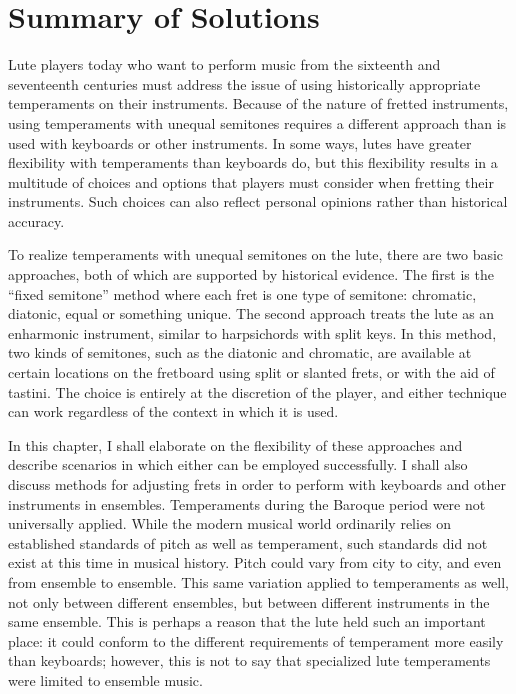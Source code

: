 \chapter{Summary of Solutions}

Lute players today who want to perform music from the sixteenth and seventeenth
centuries must address the issue of using historically appropriate temperaments on
their instruments. Because of the nature of fretted instruments, using temperaments
with unequal semitones requires a different approach than is used with keyboards or
other instruments. In some ways, lutes have greater flexibility with temperaments than
keyboards do, but this flexibility results in a multitude of choices and options that
players must consider when fretting their instruments. Such choices can also reflect
personal opinions rather than historical accuracy.

To realize temperaments with unequal semitones on the lute, there are two basic approaches, both of
which are supported by historical evidence. The first is the ``fixed semitone'' method where each
fret is one type of semitone: chromatic, diatonic, equal or something unique. The second approach
treats the lute as an enharmonic instrument, similar to harpsichords with split keys. In this
method, two kinds of semitones, such as the diatonic and chromatic, are available at certain
locations on the fretboard using split or slanted frets, or with the aid of tastini. The choice is
entirely at the discretion of the player, and either technique can work regardless of the context in
which it is used.

In this chapter, I shall elaborate on the flexibility of these approaches and describe scenarios in
which either can be employed successfully.  I shall also discuss methods for adjusting frets in
order to perform with keyboards and other instruments in ensembles. Temperaments  during the Baroque
period were not universally applied.  While the modern musical world ordinarily relies on
established standards of pitch as well as temperament, such standards did not exist at this time in
musical history. Pitch could vary from city to city, and even from ensemble to ensemble. This same
variation applied to temperaments as well, not only between different ensembles, but between
different instruments in the same ensemble. This is perhaps a reason that the lute held such an
important place: it could conform to the different requirements of temperament more easily than
keyboards; however, this is not to say that specialized lute temperaments were limited to ensemble
music.

